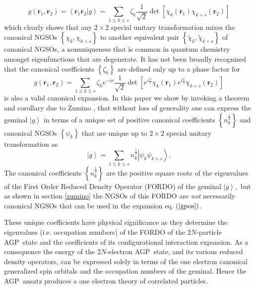 \documentclass[preprint,aps,showkeys]{revtex4}%
\begin{document}
\begin{equation}
g\left(  \mathbf{r}_{1},\mathbf{r}_{2}\right)  =\left\langle \mathbf{r}%
_{1}\mathbf{r}_{2}|g\right\rangle =\sum_{1\leq k\leq s}\zeta_{k}\frac{1}%
{\sqrt{2}}\det\left[  \chi_{k}\left(  \mathbf{r}_{1}\right)  \chi_{k+s}\left(
\mathbf{r}_{2}\right)  \right]  \label{gslat}%
\end{equation}
which clearly shows that any $2\times2$ special unitary transformation mixes
the canonical NGSOs $\left\{  \chi_{k},\chi_{k+s}\right\}  $ to another
equivalent pair $\left\{  \tilde{\chi}_{k},\tilde{\chi}_{k+s}\right\}  $ of
canonical NGSOs, a nonuniqueness that is common in quantum chemistry amongst
eigenfunctions that are degenerate. It has not been broadly recognized that
the canonical coefficients $\left\{  \zeta_{k}\right\}  $ are defined only up
to a phase factor for
\begin{equation}
g\left(  \mathbf{r}_{1},\mathbf{r}_{2}\right)  =\sum_{1\leq k\leq s}\zeta
_{k}e^{-i\nu}\frac{1}{\sqrt{2}}\det\left[  e^{i\frac{\nu}{2}}\chi_{k}\left(
\mathbf{r}_{1}\right)  e^{i\frac{\nu}{2}}\chi_{k+s}\left(  \mathbf{r}%
_{2}\right)  \right]
\end{equation}
is also a valid canonical expansion. In this paper we show by invoking a
theorem and corollary due to Zumino \cite{Zumino62}, that without loss of
generality one can express the geminal $\left\vert g\right\rangle $ in terms
of a unique set of positive canonical coefficients $\left\{  n_{k}^{\frac
{1}{2}}\right\}  $ and canonical NGSOs $\left\{  \psi_{k}\right\}  $ that are
unique up to $2\times2$ special unitary transformation as
\begin{equation}
\left\vert g\right\rangle =\sum_{1\leq k\leq s}n_{k}^{\frac{1}{2}}\left\vert
\psi_{k}\psi_{k+s}\right\rangle . \label{gpos}%
\end{equation}
The canonical coefficients $\left\{  n_{k}^{\frac{1}{2}}\right\}  $ are the
positive square roots of the eigenvalues of the First Order Reduced Density
Operator (FORDO) of the geminal $\left\vert g\right\rangle ,$ but as shown in
section \ref{zumino} the NGSOs of this FORDO are \emph{not} necessarily
canonical NGSOs that can be used in the expansion eq. $\left(  \ref{gpos}%
\right)  $.

These unique coefficients have physical significance as they determine the
eigenvalues (i.e. occupation numbers) of the FORDO of the $2N$-particle
AGP\ state and the coefficients of its configurational interaction expansion.
As a consequence the energy of the $2N$-electron AGP\ state, and its various
reduced density operators, can be expressed solely in terms of the one
electron canonical generalized spin orbitals and the occupation numbers of the
geminal. Hence the AGP\ ansatz produces a one electron theory of correlated particles.
\end{document}
